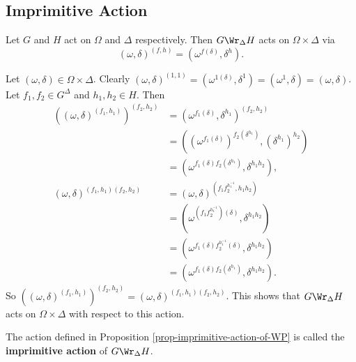\subsection{Imprimitive Action}
\begin{proposition} \label{prop-imprimitive-action-of-WP}
	Let $G$ and $H$ act on $\Omega$ and $\Delta$ respectively. Then $G\Wr_\Delta H$  acts on $\Omega\times \Delta$ via
	\begin{equation*}
		(\omega,\delta)^{(f,h)} = (\omega^{f(\delta)},\delta^h).
	\end{equation*} 
\end{proposition}
\begin{sketch}
	Let $(\omega,\delta)\in \Omega\times \Delta$. 
	Clearly $(\omega,\delta)^{(1,1)} =  (\omega^{1(\delta)},\delta^1) = (\omega^{1},\delta) = (\omega,\delta)$. Let $f_1,f_2\in G^\Delta$ and $h_1,h_2\in H$. Then  
\begin{align*}
	((\omega,\delta)^{(f_1,h_1)})^{(f_2,h_2)} &= (\omega^{f_1(\delta)},\delta^{h_1})^{(f_2,h_2)} 
	\\
	&= ((\omega^{f_1(\delta)})^{f_2(\delta^{h_1})},(\delta^{h_1})^{h_2})
	\\
	&= (\omega^{f_1(\delta)f_2(\delta^{h_1})},\delta^{h_1h_2}),
	\\
	(\omega,\delta)^{(f_1,h_1)(f_2,h_2)} &= (\omega,\delta)^{(f_1f_2^{h_1^{-1}},h_1h_2)}
	\\
	&= (\omega^{(f_1f_2^{h_1^{-1}})(\delta)},\delta^{h_1h_2})
	\\
	&= (\omega^{f_1(\delta)f_2^{h_1^{-1}}(\delta)},\delta^{h_1h_2})
	\\
	&= (\omega^{f_1(\delta)f_2(\delta^{h_1})},\delta^{h_1h_2}).
\end{align*}
So $((\omega,\delta)^{(f_1,h_1)})^{(f_2,h_2)}  = (\omega,\delta)^{(f_1,h_1)(f_2,h_2)}$. This shows that $G\Wr_{\Delta} H$ acts on $\Omega\times \Delta$ with respect to this action.
\end{sketch}
\begin{definition}
	The action defined in Proposition \ref{prop-imprimitive-action-of-WP} is called the \textbf{imprimitive action} of $G\Wr_{\Delta} H$.
\end{definition}

